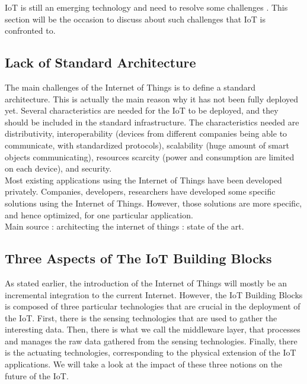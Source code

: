 IoT is still an emerging technology and need to resolve some challenges \cite{website:iot_challenge}. This section will be the occasion to discuss about such challenges that IoT is confronted to.

\subsection{Lack of Standard Architecture}

The main challenges of the Internet of Things is to define a standard architecture. This is actually the main reason why it has not been fully deployed yet. Several characteristics are needed for the IoT to be deployed, and they should be included in the standard infrastructure. The characteristics needed are distributivity, interoperability (devices from different companies being able to communicate, with standardized protocols), scalability (huge amount of smart objects communicating), resources scarcity (power and consumption are limited on each device), and security.\\

Most existing applications using the Internet of Things have been developed privately. Companies, developers, researchers have developed some specific solutions using the Internet of Things. However, those solutions are more specific, and hence optimized, for one particular application.\\

Main source : architecting the internet of things : state of the art.\\

\subsection{Three Aspects of The IoT Building Blocks}

As stated earlier, the introduction of the Internet of Things will mostly be an incremental integration to the current Internet. However, the IoT Building Blocks is composed of three particular technologies that are crucial in the deployment of the IoT. First, there is the sensing technologies that are used to gather the interesting data. Then, there is what we call the middleware layer, that processes and manages the raw data gathered from the sensing technologies. Finally, there is the actuating technologies, corresponding to the physical extension of the IoT applications. We will take a look at the impact of these three notions on the future of the IoT.\\

